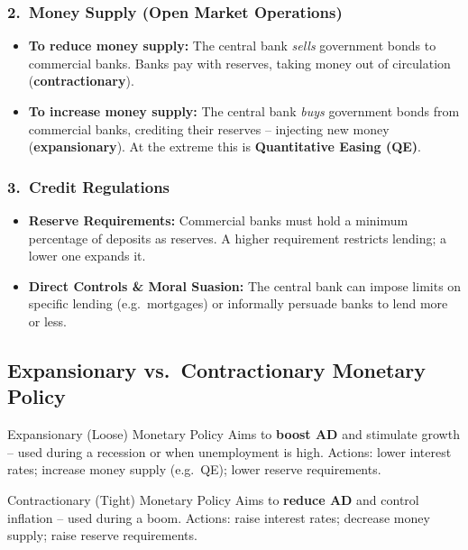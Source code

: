 \documentclass[11pt, a4paper, twoside]{book}
\begin{document}
\subsubsection{2.\ Money Supply (Open Market Operations)}

\begin{itemize}
  \item \textbf{To reduce money supply:} The central bank \emph{sells} government bonds to commercial banks. Banks pay with reserves, taking money out of circulation (\textbf{contractionary}).
  \item \textbf{To increase money supply:} The central bank \emph{buys} government bonds from commercial banks, crediting their reserves -- injecting new money (\textbf{expansionary}). At the extreme this is \textbf{Quantitative Easing (QE)}.
\end{itemize}

\subsubsection{3.\ Credit Regulations}

\begin{itemize}
  \item \textbf{Reserve Requirements:} Commercial banks must hold a minimum percentage of deposits as reserves. A higher requirement restricts lending; a lower one expands it.
  \item \textbf{Direct Controls \& Moral Suasion:} The central bank can impose limits on specific lending (e.g.\ mortgages) or informally persuade banks to lend more or less.
\end{itemize}

\subsection{Expansionary vs.\ Contractionary Monetary Policy}

\begin{keyterm}{Expansionary (Loose) Monetary Policy}
Aims to \textbf{boost AD} and stimulate growth -- used during a recession or when unemployment is high. Actions: lower interest rates; increase money supply (e.g.\ QE); lower reserve requirements.
\end{keyterm}

\begin{keyterm}{Contractionary (Tight) Monetary Policy}
Aims to \textbf{reduce AD} and control inflation -- used during a boom. Actions: raise interest rates; decrease money supply; raise reserve requirements.
\end{keyterm}
\end{document}
